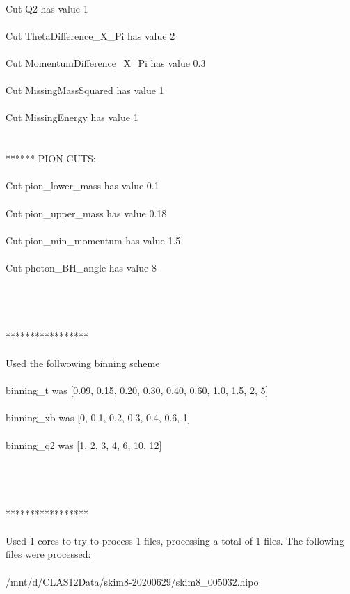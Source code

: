 \documentclass{article}
\begin{document}
\\Cut Q2 has value 1 \\
\\Cut ThetaDifference\_X\_Pi has value 2 \\
\\Cut MomentumDifference\_X\_Pi has value 0.3 \\
\\Cut MissingMassSquared has value 1 \\
\\Cut MissingEnergy has value 1 \\
\\
\\ ****** PION CUTS: 
\\ 
\\Cut pion\_lower\_mass has value 0.1 \\
\\Cut pion\_upper\_mass has value 0.18 \\
\\Cut pion\_min\_momentum has value 1.5 \\
\\Cut photon\_BH\_angle has value 8 \\
\\
\\ 
\\ 
\\ ***************** \\
\\ Used the follwowing binning scheme \\
\\binning\_t was [0.09, 0.15, 0.20, 0.30, 0.40, 0.60, 1.0, 1.5, 2, 5] \\
\\binning\_xb was [0, 0.1, 0.2, 0.3, 0.4, 0.6, 1] \\
\\binning\_q2 was [1, 2, 3, 4, 6, 10, 12] \\
\\
\\ 
\\ 
\\ ***************** \\
\\ Used 1 cores to try to process 1 files, processing a total of 1 files. The following files were processed: \\
\\/mnt/d/CLAS12Data/skim8-20200629/skim8\_005032.hipo \\
\\\clearpage 
\end{document}
